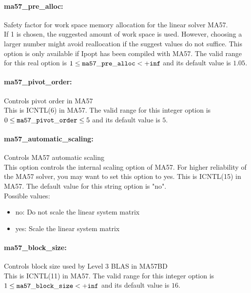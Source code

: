 \paragraph{ma57\_pre\_alloc:}\label{opt:ma57_pre_alloc} Safety factor for work space memory allocation for the linear solver MA57. \\
 If 1 is chosen, the suggested amount of work space is used.  However, choosing a larger number might avoid reallocation if the suggest values do not suffice.  This option is only available if Ipopt has been compiled with MA57. The valid range for this real option is 
$1 \le {\tt ma57\_pre\_alloc } <  {\tt +inf}$
and its default value is $1.05$.


\paragraph{ma57\_pivot\_order:}\label{opt:ma57_pivot_order} Controls pivot order in MA57 \\
 This is ICNTL(6) in MA57. The valid range for this integer option is
$0 \le {\tt ma57\_pivot\_order } \le 5$
and its default value is $5$.


\paragraph{ma57\_automatic\_scaling:}\label{opt:ma57_automatic_scaling} Controls MA57 automatic scaling \\
 This option controls the internal scaling option of MA57. For higher reliability of the MA57 solver, you may want to set this option to yes. This is ICNTL(15) in MA57. The default value for this string option is "no".
\\ 
Possible values:
\begin{itemize}
   \item no: Do not scale the linear system matrix
   \item yes: Scale the linear system matrix
\end{itemize}

\paragraph{ma57\_block\_size:}\label{opt:ma57_block_size} Controls block size used by Level 3 BLAS in MA57BD \\
 This is ICNTL(11) in MA57. The valid range for this integer option is
$1 \le {\tt ma57\_block\_size } <  {\tt +inf}$
and its default value is $16$.


